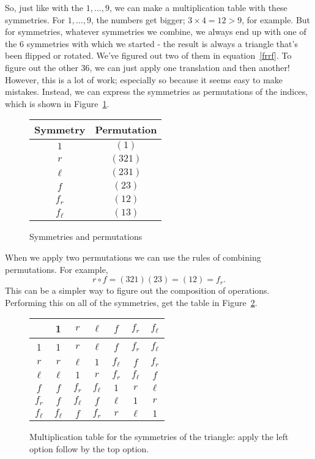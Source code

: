 \documentclass[12pt]{article}
\begin{document}
So, just like with the $1,\dots,9$, we can make a multiplication table
with these symmetries.  For $1,\dots,9$, the numbers get bigger;
$3\times{}4=12>9$, for example.  But for symmetries, whatever
symmetries we combine, we always end up with one of the 6 symmetries
with which we started - the result is always a triangle that's been
flipped or rotated.  We've figured out two of them in
equation~\eqref{frrf}.  To figure out the other 36, we can just apply
one translation and then another!  However, this is a lot of work;
especially so because it seems easy to make mistakes.  Instead, we can
express the symmetries as permutations of the indices, which is shown
in Figure~\ref{permtab}.
\begin{figure}[h]
   \centering
   \begin{tabular}{|c|c|}
     \hline
     Symmetry & Permutation \\
     \hline \hline
     $1$ & $(1)$ \\
     \hline
     $r$ & $(321)$ \\
     \hline
     $\ell$ & $(231)$ \\
     \hline
     $f$ & $(23)$ \\
     \hline
     $f_r$ & $(12)$ \\
     \hline
     $f_\ell$ & $(13)$ \\
     \hline
   \end{tabular}
   \caption{Symmetries and permutations}
  \label{permtab}
\end{figure}
When we apply two permutations we can use the rules of combining
permutations.  For example,
\begin{dmath}
  r \circ f
  = (321)(23)
  = (12)
  = f_r.
\end{dmath}
This can be a simpler way to figure out the composition of operations.
Performing this on all of the symmetries, get the table in
Figure~\ref{multtab}.
\begin{figure}[h]
  \centering
  \begin{tabular}{c|cccccc|}
    & 1 & $r$ & $\ell$ & $f$ & $f_r$ & $f_\ell$ \\
    \hline
    1        & 1        & $r$    & $\ell$    & $f$ & $f_r$ & $f_\ell$ \\
    $r$      & $r$      & $\ell$ & $1$       & $f_\ell$ & $f$   & $f_r$      \\
    $\ell$   & $\ell$   & $1$    & $r$       & $f_r$ & $f_\ell$   & $f$      \\
    $f$      & $f$      & $f_r$  & $f_\ell$   & $1$ & $r$   & $\ell$      \\
    $f_r$    & $f$     & $f_\ell$   & $f$    & $\ell$ & $1$   & $r$      \\
    $f_\ell$  & $f_\ell$   & $f$   & $f_r$      & $r$ & $\ell$   & $1$      \\
    \hline
  \end{tabular}
  \caption{Multiplication table for the symmetries of the triangle:
    apply the left option follow by the top option.}
  \label{multtab}
\end{figure}
\end{document}
